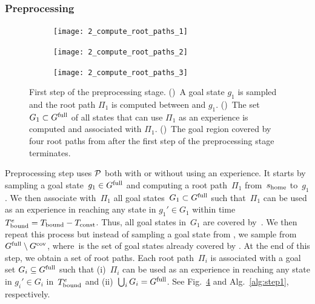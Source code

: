 \documentclass[a4paper]{report}
\begin{document}
\subsubsection{Preprocessing}
\begin{figure}[t]
    \centering
    \begin{subfigure}{.45\textwidth}
        \texttt{[image: 2\_compute\_root\_paths\_1]}
        \caption{}
        \label{fig:crp1}
    \end{subfigure}
    \hspace{4mm}
    \begin{subfigure}{0.45\textwidth}
        \texttt{[image: 2\_compute\_root\_paths\_2]}
        \caption{}
        \label{fig:crp2}
    \end{subfigure}
    \hspace{4mm}
    \begin{subfigure}{0.45\textwidth}
        \texttt{[image: 2\_compute\_root\_paths\_3]}
        \caption{}
        \label{fig:crp3}
    \end{subfigure}
    \caption{\CaptionTextSize
    First step of the preprocessing stage.
    ()~A goal state $g_1$ is sampled and the root path $\Pi_1$ is computed between \Shome and $g_1$.
    ()~The set $G_1 \subset G^{\textrm{full}}$ of all states that can use $\Pi_1$ as an experience is computed and associated with $\Pi_1$.
    ()~The goal region covered by four root paths from \Shome after the first step of the preprocessing stage terminates.
    }
    \label{fig:crp}
    \vspace{-5mm}
\end{figure}
Preprocessing step uses $\mathcal{P}$ both with or without using an experience. It starts by sampling a goal state~$g_1 \in G^{\textrm{full}}$ and computing a root path~$\Pi_1$ from~$s_{\textrm{home}}$ to~$g_1$. We then associate with~$\Pi_1$ all goal states~$G_1 \subset G^{\textrm{full}}$ such that~$\Pi_1$ can be used as an experience in reaching any state in $g_1' \in G_1$ within time~$T_{\textrm{bound}}^e =  T_{\textrm{bound}} - T_\textrm{const}$. 
Thus, all goal states in~$G_1$ are covered by~\Shome.
%
We then repeat this process but instead of sampling  a goal state from \Gfull, we sample from $G^{\textrm{full}} \setminus G^{\textrm{cov}}$, where~\Gcov is the set of goal states already covered by \Shome.
At the end of this step, we obtain a set of root paths. 
Each root path~$\Pi_i$ is associated with a goal set $G_i \subseteq G^{\textrm{full}}$ such that 
(i)~$\Pi_i$ can be used as an experience in reaching any state in $g_i' \in G_i$ in~$T_{\textrm{bound}}^e$ and 
(ii)~$\bigcup_i G_i = G^{\textrm{full}}$.
%
See Fig.~\ref{fig:crp} and  Alg.~\ref{alg:step1}, respectively.
\end{document}
